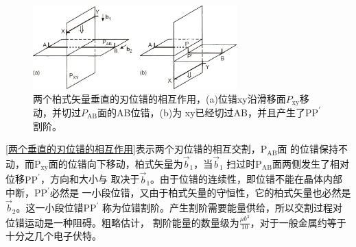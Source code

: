                 \begin{figure}[ht]
                    \centering
                    \includegraphics[width=0.7\textwidth]{fig/Intersection_of_edge_dislocations_with_Burgers_vectors_at_right_angles_to_each_other.jpg}
                    \caption{两个柏式矢量垂直的刃位错的相互作用\cite{HULL2011137}，(a)位错xy沿滑移面$P_{\mathrm{xy}}$移动，并切过$P_{\mathrm{AB}}$面的AB位错，(b)为
                        xy已经切过AB，并且产生了$\mathrm{PP}^{\prime}$割阶。}
                    \label{两个垂直的刃位错的相互作用}
                \end{figure}
                
                \autoref{两个垂直的刃位错的相互作用}表示两个刃位错的相互交割，$\mathrm{P}_{\mathrm{AB}}$面
                的位错保持不动，而$\mathrm{P}_{\mathrm{xy}}$面的位错向下移动，柏式矢量为$\vec{b}_1$，当$\vec{b}_1$
                扫过时$\mathrm{P}_{\mathrm{AB}}$面两侧发生了相对位移$\mathrm{PP}^{\prime}$，方向和大小与
                取决于$\vec{b}_1$。由于位错的连续性，即位错不能在晶体内部中断，$\mathrm{PP}^{\prime}$必然是
                一小段位错，又由于柏式矢量的守恒性，它的柏式矢量也必然是$\vec{b}_2$。这一小段位错$\mathrm{PP}^{\prime}$
                称为位错割阶。产生割阶需要能量供给，所以交割过程对位错运动是一种阻碍。粗略估计，
                割阶能量的数量级为$\frac{\mu b^3}{10}$，对于一般金属约等于十分之几个电子伏特。

